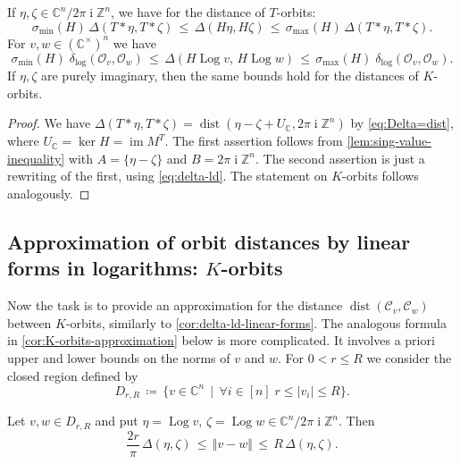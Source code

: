 \documentclass[a4paper,USenglish,cleveref,numberwithinsect]{lipics-v2021}
\DeclareMathOperator{\ii}{i}
\DeclareMathOperator{\Log}{Log}
\DeclareMathOperator{\dist}{dist}
\newcommand{\distLD}{\delta_{\log}}
\DeclareMathOperator{\ran}{im}
\newcommand{\CC}{\mathbb{C}}
\newcommand{\ZZ}{\mathbb{Z}}
\newcommand{\OO}{\ensuremath{\mathcal{O}}}
\newcommand{\KK}{\ensuremath{\mathcal{C}}}
\numberwithin{equation}{section}
\begin{document}
\begin{proposition}\label{cor:delta-ld-linear-forms} %
If $\eta,\zeta\in\CC^n/2\pi\ii\ZZ^n$, we have for the distance of $T$-orbits:
\[
\sigma_{\min}(H)\, \Delta(T\ast\eta,T\ast\zeta) \,\leq\, \Delta(H\eta,H\zeta)
   \,\leq\, \sigma_{\max}(H) \, \Delta(T\ast\eta,T\ast\zeta).
\]
For $v,w\in(\CC^\times)^n$ we have
\[
 \sigma_{\min}(H)\; \distLD(\OO_v, \OO_w) \,\leq\, \Delta(H\Log v,\, H\Log w)\,\leq\,
  \sigma_{\max}(H)\; \distLD(\OO_v, \OO_w).
\]
If $\eta,\zeta$ are purely imaginary, then the same bounds hold for the distances of $K$-orbits.
\end{proposition}

\begin{proof}
We have
$\Delta(T\ast\eta,T\ast \zeta) = \dist( \eta-\zeta + U_\CC , 2\pi\ii\ZZ^n)$
by \cref{eq:Delta=dist},
where $U_\CC=\ker H =\ran M^T$.
The first assertion follows from \cref{lem:sing-value-inequality}
with $A =\{\eta-\zeta\}$ and $B=2\pi\ii\ZZ^n$.
The second assertion is just a rewriting of the first, using \cref{eq:delta-ld}.
The statement on $K$-orbits follows analogously.
\end{proof}


\subsection{Approximation of orbit distances by linear forms in logarithms: \texorpdfstring{$K$}{K}-orbits}
Now the task is to provide an approximation
for the distance $\dist(\KK_v,\KK_w)$ between $K$-orbits,
similarly to \cref{cor:delta-ld-linear-forms}.
The analogous formula in \cref{cor:K-orbits-approximation} below is more complicated.
It involves a priori upper and lower bounds on the norms of $v$ and $w$.
For $0<r\leq R$ we consider the closed region defined by
\begin{equation}\label{eq:DrR}
 D_{r, R} \,\coloneqq\, \{ v\in\CC^n \, \mid\, \forall i\in [n]\; r \leq |v_i|\leq R \}.
\end{equation}

\begin{lemma}
\label{lem:delta-dist}
Let $v,w\in D_{r, R}$ and put $\eta = \Log v$, $\zeta = \Log w\in\CC^n/2\pi\ii\ZZ^n$. Then
\[
 \frac{2r}{\pi}\, \Delta(\eta,\zeta) \, \leq \, \Vert v-w\Vert\, \leq \, R\, \Delta(\eta,\zeta).
\]
\end{lemma}
\end{document}
